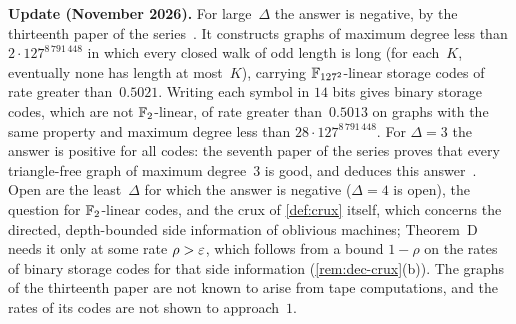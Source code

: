 \textbf{Update (November 2026).} For large~$\Delta$ the answer is negative, by the thirteenth paper of the
series~\cite[Corollary~U]{StorageCodes2026}. It constructs graphs of maximum degree less than $2\cdot127^{8\,791\,448}$
in which every closed walk of odd length is long (for each~$K$, eventually none has length at most~$K$), carrying
$\mathbb{F}_{127^2}$-linear storage codes of rate greater than~$0.5021$. Writing each symbol in $14$ bits gives binary storage
codes, which are not $\mathbb{F}_2$-linear, of rate greater than~$0.5013$ on graphs with the same property and maximum degree
less than $28\cdot127^{8\,791\,448}$. For $\Delta=3$ the answer is positive for all codes: the seventh paper of the
series proves that every triangle-free graph of maximum degree~$3$ is good, and deduces this
answer~\cite[Theorem~N3 and Section~4.2]{NestedElimination2026}. Open are the least~$\Delta$ for which the answer is
negative ($\Delta=4$ is open), the question for $\mathbb{F}_2$-linear codes, and the crux of \cref{def:crux} itself, which
concerns the directed, depth-bounded side information of oblivious machines; Theorem~D needs it only at some rate
$\rho>\varepsilon$, which follows from a bound $1-\rho$ on the rates of binary storage codes for that side information
(\cref{rem:dec-crux}(b)). The graphs of the thirteenth paper are not known to arise from tape computations, and the
rates of its codes are not shown to approach~$1$.

